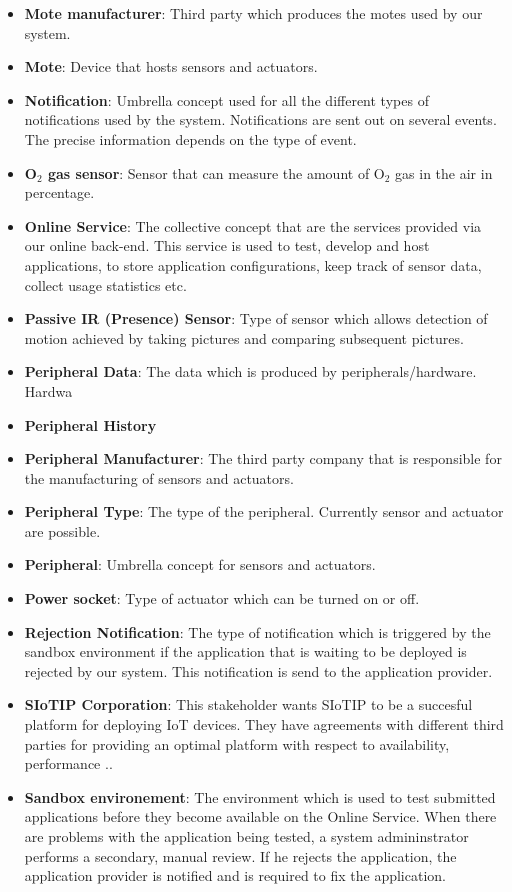 \documentclass[english,peerreview]{sareport}
\begin{document}
\begin{itemize}
	\item \textbf{Mote manufacturer}: Third party which produces the motes used by our system.
	\item \textbf{Mote}: Device that hosts sensors and actuators.
	\item \textbf{Notification}: Umbrella concept used for all the different types of notifications used by the system. Notifications are sent out on several events. The precise information depends on the type of event.
	\item \textbf{O$_2$ gas sensor}: Sensor that can measure the amount of O$_2$ gas in the air  in percentage.
	\item \textbf{Online Service}: The collective concept that are the services provided via our online back-end. This service is used to test, develop and host applications, to store application configurations, keep track of sensor data, collect usage statistics etc. 
	\item \textbf{Passive IR (Presence) Sensor}: Type of sensor which allows detection of motion achieved by taking pictures and comparing subsequent pictures.
	\item \textbf{Peripheral Data}: The data which is produced by peripherals/hardware. Hardwa
	\item \textbf{Peripheral History}
	\item \textbf{Peripheral Manufacturer}: The third party company that is responsible for the manufacturing of sensors and actuators.
	\item \textbf{Peripheral Type}: The type of the peripheral. Currently sensor and actuator are possible.
	\item \textbf{Peripheral}: Umbrella concept for sensors and actuators.
	\item \textbf{Power socket}: Type of actuator which can be turned on or off.
	\item \textbf{Rejection Notification}: The type of notification which is triggered by the sandbox environment if the application that is waiting to be deployed is rejected by our system. This notification is send to the application provider.
	\item \textbf{SIoTIP Corporation}: This stakeholder wants SIoTIP to be a succesful platform for deploying IoT devices. They have agreements with different third parties for providing an optimal platform with respect to availability, performance ..
	\item \textbf{Sandbox environement}: The environment which is used to test submitted applications before they become available on the Online Service. When there are problems with the application being tested, a system admininstrator performs a secondary, manual review. If he rejects the application, the application provider is notified and is required to fix the application.

\end{itemize}
\end{document}
